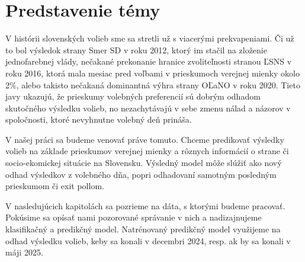 \documentclass[main.tex]{subfiles}
\begin{document}
	
\section{Predstavenie témy}	
	
V histórii slovenských volieb sme sa stretli už s viacerými prekvapeniami. Či už to bol výsledok strany Smer SD v roku 2012, ktorý im stačil na zloženie jednofarebnej vlády, nečakané prekonanie hranice zvoliteľnosti stranou ĽSNS v roku 2016, ktorá mala mesiac pred voľbami v prieskumoch verejnej mienky okolo 2\%, alebo takisto nečakaná dominantná výhra strany OĽaNO v roku 2020. Tieto javy ukazujú, že prieskumy volebných preferencií sú dobrým odhadom skutočného výsledku volieb, no nezachytávajú v sebe zmenu nálad a názorov v spoločnosti, ktoré nevyhnutne volebný deň prináša.

V našej práci sa budeme venovať práve tomuto. Chceme predikovať výsledky volieb na základe prieskumov verejnej mienky a rôznych informácií o strane či socio-ekomickej situácie na Slovensku. Výsledný model môže slúžiť ako nový odhad výsledkov z volebného dňa, popri odhadovaní samotným posledným prieskumom či exit pollom. 

V nasledujúcich kapitolách sa pozrieme na dáta, s ktorými budeme pracovať. Pokúsime sa opísať nami pozorované správanie v nich a nadizajnujeme klasifikačný a predikčný model. Natrénovaný predikčný model využijeme na odhad výsledku volieb, keby sa konali v decembri 2024, resp. ak by sa konali v máji 2025.
	
\end{document}
